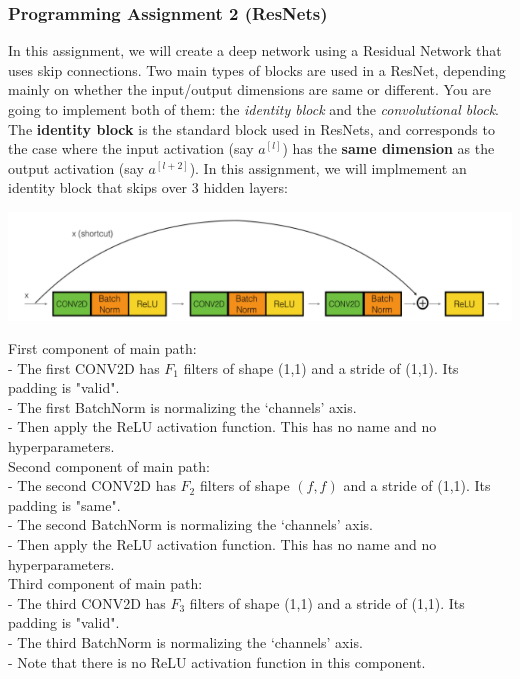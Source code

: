 \documentclass[11pt, a4paper]{article}
\begin{document}
\begin{spacing}{1.1}
	\subsubsection{Programming Assignment 2 (ResNets)}
	In this assignment, we will create a deep network using a Residual Network that uses skip connections. Two main types of blocks are used in a ResNet, depending mainly on whether the input/output dimensions are same or different. You are going to implement both of them: the \textit{identity block} and the \textit{convolutional block}. \vspace*{2mm}\\
	The \textbf{identity block} is the standard block used in ResNets, and corresponds to the case where the input activation (say $a^{[l]}$) has the \textbf{same dimension} as the output activation (say $a^{[l+2]}$). In this assignment, we will implmement an identity block that skips over 3 hidden layers:
	\begin{center}	\includegraphics[scale=.8]{skip_3}	\end{center}
	First component of main path: \\
	- The first CONV2D has $F_1$ filters of shape (1,1) and a stride of (1,1). Its padding is "valid".\\
	- The first BatchNorm is normalizing the `channels' axis. \\
	- Then apply the ReLU activation function. This has no name and no hyperparameters. \vspace*{1mm}\\
	Second component of main path:\\
	- The second CONV2D has $F_2$ filters of shape $(f,f)$ and a stride of (1,1). Its padding is "same".\\
	- The second BatchNorm is normalizing the `channels' axis. \\
	- Then apply the ReLU activation function. This has no name and no hyperparameters. \vspace*{1mm}\\
	Third component of main path:\\
	- The third CONV2D has $F_3$ filters of shape (1,1) and a stride of (1,1). Its padding is "valid".\\
	- The third BatchNorm is normalizing the `channels' axis. \\
	- Note that there is no ReLU activation function in this component. \newpage


\end{spacing}
\end{document}
